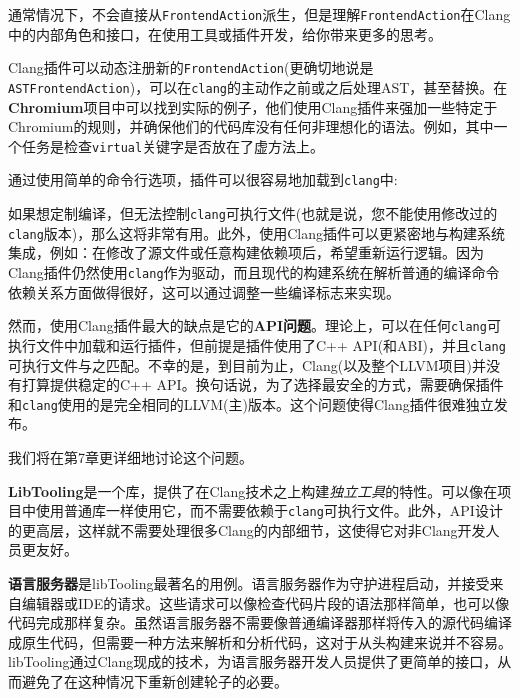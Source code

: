 通常情况下，不会直接从\texttt{FrontendAction}派生，但是理解\texttt{FrontendAction}在Clang中的内部角色和接口，在使用工具或插件开发，给你带来更多的思考。


Clang插件可以动态注册新的\texttt{FrontendAction}(更确切地说是\texttt{ASTFrontendAction})，可以在\texttt{clang}的主动作之前或之后处理AST，甚至替换。在\textbf{Chromium}项目中可以找到实际的例子，他们使用Clang插件来强加一些特定于Chromium的规则，并确保他们的代码库没有任何非理想化的语法。例如，其中一个任务是检查\texttt{virtual}关键字是否放在了虚方法上。

通过使用简单的命令行选项，插件可以很容易地加载到\texttt{clang}中:


如果想定制编译，但无法控制\texttt{clang}可执行文件(也就是说，您不能使用修改过的\texttt{clang}版本)，那么这将非常有用。此外，使用Clang插件可以更紧密地与构建系统集成，例如：在修改了源文件或任意构建依赖项后，希望重新运行逻辑。因为Clang插件仍然使用\texttt{clang}作为驱动，而且现代的构建系统在解析普通的编译命令依赖关系方面做得很好，这可以通过调整一些编译标志来实现。

然而，使用Clang插件最大的缺点是它的\textbf{API问题}。理论上，可以在任何\texttt{clang}可执行文件中加载和运行插件，但前提是插件使用了C++ API(和ABI)，并且\texttt{clang}可执行文件与之匹配。不幸的是，到目前为止，Clang(以及整个LLVM项目)并没有打算提供稳定的C++ API。换句话说，为了选择最安全的方式，需要确保插件和\texttt{clang}使用的是完全相同的LLVM(主)版本。这个问题使得Clang插件很难独立发布。

我们将在第7章更详细地讨论这个问题。


\textbf{LibTooling}是一个库，提供了在Clang技术之上构建\textit{独立工具}的特性。可以像在项目中使用普通库一样使用它，而不需要依赖于\texttt{clang}可执行文件。此外，API设计的更高层，这样就不需要处理很多Clang的内部细节，这使得它对非Clang开发人员更友好。

\textbf{语言服务器}是libTooling最著名的用例。语言服务器作为守护进程启动，并接受来自编辑器或IDE的请求。这些请求可以像检查代码片段的语法那样简单，也可以像代码完成那样复杂。虽然语言服务器不需要像普通编译器那样将传入的源代码编译成原生代码，但需要一种方法来解析和分析代码，这对于从头构建来说并不容易。libTooling通过Clang现成的技术，为语言服务器开发人员提供了更简单的接口，从而避免了在这种情况下重新创建轮子的必要。

